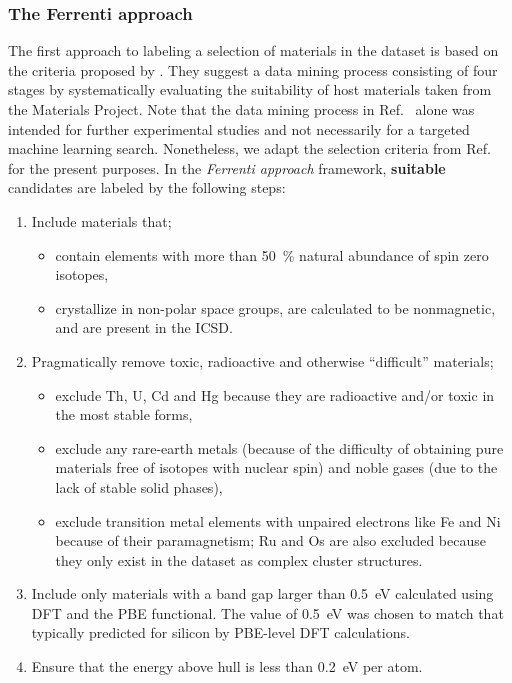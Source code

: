 \documentclass[superscriptaddress,
preprint,
 amsmath,amssymb,
 aps,
]{revtex4-2}
\begin{document}
\subsubsection*{The Ferrenti approach}
The first approach to labeling a selection of materials in the dataset is based on the criteria proposed by \citeauthor{Ferrenti2020} \cite{Ferrenti2020}. 
They suggest a data mining process consisting of four stages by systematically evaluating the suitability of host materials taken from the Materials Project. 
Note that the data mining process in Ref.~\cite{Ferrenti2020} alone was intended for further experimental studies and not necessarily for a targeted machine learning search. Nonetheless, we adapt the selection criteria from Ref.~\cite{Ferrenti2020} for the present purposes. 
In the \emph{Ferrenti approach} framework, \textbf{suitable} candidates are labeled by the following steps: 
\begin{enumerate}
    \item Include materials that;
    \begin{itemize}
        \item contain elements with more than \SI{50}{\percent} natural abundance of spin zero isotopes,
        \item crystallize in non-polar space groups, are calculated to be nonmagnetic, and 
        are present in the ICSD.
    \end{itemize}
    \item Pragmatically remove toxic, radioactive and otherwise ``difficult'' materials;
    \begin{itemize}
        \item exclude Th, U, Cd and Hg because they are radioactive and/or toxic in the most stable forms,
        \item exclude any rare-earth metals (because of the difficulty of obtaining pure materials free of isotopes with nuclear spin) and noble gases (due to the lack of stable solid phases),
        \item exclude transition metal elements with unpaired electrons like Fe and Ni because of their paramagnetism; Ru and Os are also excluded because they only exist in the dataset as complex cluster structures. 
    \end{itemize}
    \item Include only materials with a band gap larger than \SI{0.5}{\electronvolt} calculated using DFT and the PBE functional.
    The value of \SI{0.5}{\electronvolt} was chosen to match that typically predicted for silicon by PBE-level DFT calculations. 
    \item Ensure that the energy above hull is less than \SI{0.2}{\electronvolt} per atom.
\end{enumerate}
\end{document}
